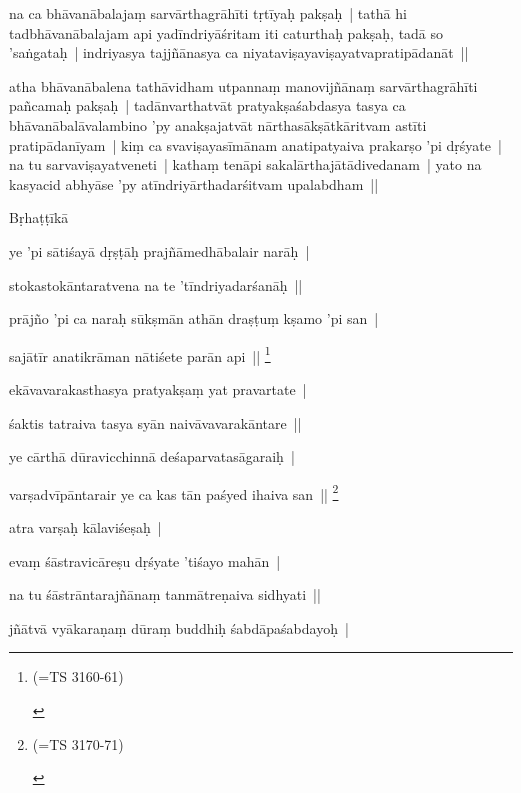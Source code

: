 \documentclass[article,a4paper]{memoir}
\begin{document}
	  \pstart na ca bhā\-vanā\-balajaṃ sarvā\-rthagrā\-hī\-ti tṛtī\-yaḥ pakṣaḥ | tathā\- hi tadbhā\-vanā\-balajam api yadī\-ndriyā\-śritam iti caturthaḥ pakṣaḥ, tadā\- so 'saṅgataḥ | indriyasya tajjñā\-nasya ca niyataviṣayaviṣayatvapratipā\-danā\-t || 
	\pend
      

	  \pstart atha bhā\-vanā\-balena tathā\-vidham utpannaṃ manovijñā\-naṃ sarvā\-rthagrā\-hī\-ti pañcamaḥ pakṣaḥ | tadā\-nvarthatvā\-t pratyakṣaśabdasya tasya ca bhā\-vanā\-balā\-valambino 'py anakṣajatvā\-t nā\-rthasā\-kṣā\-tkā\-ritvam astī\-ti pratipā\-danī\-yam | kiṃ ca svaviṣayasī\-mā\-nam anatipatyaiva prakarṣo 'pi dṛśyate | na tu sarvaviṣayatveneti | kathaṃ tenā\-pi sakalā\-rthajā\-tā\-divedanam | yato na kasyacid abhyā\-se 'py atī\-ndriyā\-rthadarśitvam upalabdham || 
	\pend
      

	  \pstart Bṛhaṭṭī\-kā\- 
	\pend
      

	  \pstart ye 'pi sā\-tiśayā\- dṛṣṭā\-ḥ prajñā\-medhā\-balair narā\-ḥ | 
	\pend
      

	  \pstart stokastokā\-ntaratvena na te 'tī\-ndriyadarśanā\-ḥ || 
	\pend
      

	  \pstart prā\-jño 'pi ca naraḥ sū\-kṣmā\-n athā\-n draṣṭuṃ kṣamo 'pi san | 
	\pend
      

	  \pstart sajā\-tī\-r anatikrā\-man nā\-tiśete parā\-n api || \footnote{\begin{english}(=TS 3160-61)\end{english}}
	\pend
      

	  \pstart ekā\-vavarakasthasya pratyakṣaṃ yat pravartate | 
	\pend
      

	  \pstart śaktis tatraiva tasya syā\-n naivā\-vavarakā\-ntare || 
	\pend
      

	  \pstart ye cā\-rthā\- dū\-ravicchinnā\- deśaparvatasā\-garaiḥ | 
	\pend
      

	  \pstart varṣadvī\-pā\-ntarair ye ca kas tā\-n paśyed ihaiva san || \footnote{\begin{english}(=TS 3170-71)\end{english}}
	\pend
      

	  \pstart atra varṣaḥ kā\-laviśeṣaḥ | 
	\pend
      

	  \pstart evaṃ śā\-stravicā\-reṣu dṛśyate 'tiśayo mahā\-n | 
	\pend
      

	  \pstart na tu śā\-strā\-ntarajñā\-naṃ tanmā\-treṇaiva sidhyati || 
	\pend
      

	  \pstart jñā\-tvā\- vyā\-karaṇaṃ dū\-raṃ buddhiḥ śabdā\-paśabdayoḥ | 
	\pend
      
\end{document}
